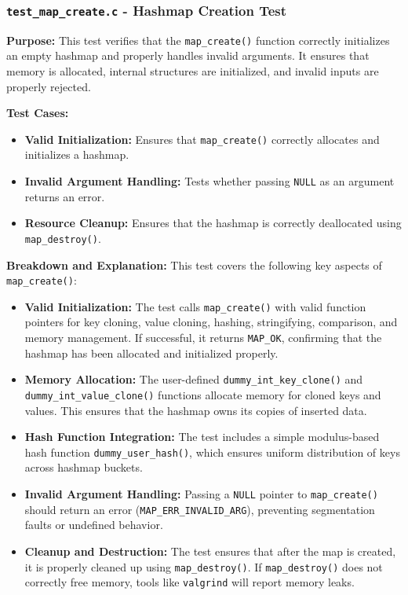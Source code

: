 \documentclass[titlepage]{article}
\begin{document}
\subsubsection{\texttt{test\_map\_create.c} - Hashmap Creation Test}

\textbf{Purpose:}
This test verifies that the \texttt{map\_create()} function correctly initializes an empty hashmap and properly handles invalid arguments.
It ensures that memory is allocated, internal structures are initialized, and invalid inputs are properly rejected.

\textbf{Test Cases:}
\begin{itemize}
    \item \textbf{Valid Initialization:} Ensures that \texttt{map\_create()} correctly allocates and initializes a hashmap.
    \item \textbf{Invalid Argument Handling:} Tests whether passing \texttt{NULL} as an argument returns an error.
    \item \textbf{Resource Cleanup:} Ensures that the hashmap is correctly deallocated using \texttt{map\_destroy()}.
\end{itemize}

\textbf{Breakdown and Explanation:}
This test covers the following key aspects of \texttt{map\_create()}:

\begin{itemize}
    \item \textbf{Valid Initialization:} The test calls \texttt{map\_create()} with valid function pointers for key cloning, value cloning, hashing, stringifying, comparison, and memory management. If successful, it returns \texttt{MAP\_OK}, confirming that the hashmap has been allocated and initialized properly.
    \item \textbf{Memory Allocation:} The user-defined \texttt{dummy\_int\_key\_clone()} and \texttt{dummy\_int\_value\_clone()} functions allocate memory for cloned keys and values. This ensures that the hashmap owns its copies of inserted data.
    \item \textbf{Hash Function Integration:} The test includes a simple modulus-based hash function \texttt{dummy\_user\_hash()}, which ensures uniform distribution of keys across hashmap buckets.
    \item \textbf{Invalid Argument Handling:} Passing a \texttt{NULL} pointer to \texttt{map\_create()} should return an error (\texttt{MAP\_ERR\_INVALID\_ARG}), preventing segmentation faults or undefined behavior.
    \item \textbf{Cleanup and Destruction:} The test ensures that after the map is created, it is properly cleaned up using \texttt{map\_destroy()}. If \texttt{map\_destroy()} does not correctly free memory, tools like \texttt{valgrind} will report memory leaks.
\end{itemize}
\end{document}
